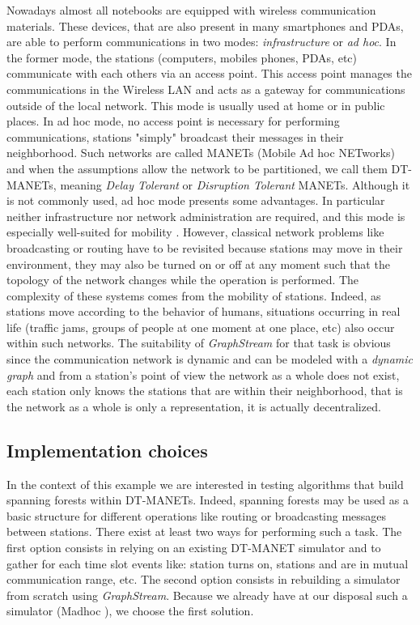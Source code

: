\documentclass{svmult}
\begin{document}
Nowadays almost all notebooks are equipped with wireless communication materials.
These devices, that are also present in many smartphones and PDAs,
are able to perform communications in two modes: {\em infrastructure} or {\em
  ad hoc}.   
In the former mode, the stations (computers, mobiles phones, PDAs, etc)
communicate with each others via an access point. This access point manages the
communications in the Wireless LAN and acts as a gateway for communications
outside of the local network. This mode is usually used at home or in public
places.  
In ad hoc mode, no access point is necessary for performing communications,
stations "simply" broadcast their messages in their neighborhood. 
Such networks are called MANETs (Mobile Ad hoc NETworks) and when the
assumptions allow the network to be partitioned, we call them DT-MANETs,
meaning {\em Delay Tolerant} or {\em Disruption Tolerant} MANETs.  
Although it is not commonly used, ad hoc mode presents some advantages. In
particular neither infrastructure nor network administration are required, and
this mode is especially well-suited for mobility \cite{Hogie2006c}.
However, classical network problems like broadcasting or routing have to be
revisited because stations may move in their environment, they may also be
turned on or off at any moment such that the topology of the network changes
while the operation is performed. 
The complexity of these systems comes from the mobility of stations. 
Indeed, as stations move according to the behavior of humans, situations
occurring in real life (traffic jams, groups of people at one moment at one
place, etc) also occur within such networks.
The suitability of \emph{GraphStream} for that task is obvious since the
communication network is dynamic and can be modeled with a 
\emph{dynamic graph} and from a station's point of view the network as a whole
does not exist, each station only knows the stations that are within their
neighborhood, that is the network as a whole is only a representation, it is
actually decentralized. 

\subsection{Implementation choices}


In the context of this example we are interested in testing algorithms that
build spanning forests within DT-MANETs. 
Indeed, spanning forests may be used as a basic structure for different
operations like routing or broadcasting messages between stations.
There exist at least two ways for performing such a task.
The first option consists in relying on an existing DT-MANET simulator and to
gather for each time slot events like: station  turns on, stations 
and  are in mutual communication range, etc. 
The second option consists in rebuilding a simulator from scratch using 
\emph{GraphStream}.
Because we already have at our disposal such a simulator ({\sc Madhoc}
\cite{Hogie2007}), we choose the first solution.
\end{document}
